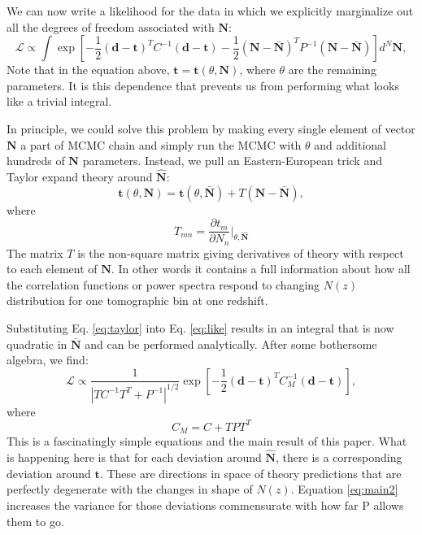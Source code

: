 \documentclass[a4paper,11pt]{article}
\newcommand{\vd}{\mathbf{d}}
\newcommand{\vt}{\mathbf{t}}
\newcommand{\vN}{\mathbf{N}}
\begin{document}
We can now write a likelihood for the data in which we explicitly marginalize out all the degrees of freedom associated with $\vN$:
\begin{equation}
\mathcal{L} \propto  \int \exp\left [-\frac{1}{2} (\vd-\vt)^T C^{-1} (\vd-\vt) -\frac{1}{2} (\vN - \bar{\vN})^T P^{-1} (\vN -\bar{\vN}) \right]  d^N\vN, \label{eq:like2}
  \end{equation}
  Note that in the equation above, $\vt=\vt(\theta,\vN)$, where $\theta$ are the remaining parameters. It is this dependence that prevents us from performing what looks like a trivial integral.

  In principle, we could solve this problem by making every single element of vector $\vN$ a part of MCMC chain and simply run the MCMC with $\theta$ and additional hundreds of $\vN$ parameters. Instead, we pull an Eastern-European trick and Taylor expand theory around $\hat{\vN}$:
  \begin{equation}
    \vt(\theta,\vN) = \vt(\theta,\bar{\vN}) + T \left(\vN - \bar{\vN} \right), \label{eq:taylor}
  \end{equation}
  where
  \begin{equation}
    T_{mn} = \frac{\partial t_m}{\partial N_n} \bigg|_{\theta,\hat{\vN}}
  \end{equation}
  The matrix $T$ is the non-square matrix giving derivatives of theory with respect to each element of $\vN$. In other words it contains a full information about how all the correlation functions or power spectra respond to changing $N(z)$ distribution for one tomographic bin at one redshift.

  Substituting Eq. \ref{eq:taylor} into Eq. \ref{eq:like} results in an integral that is now quadratic in $\bar{\vN}$ and can be performed analytically. After some bothersome algebra, we find:
  \begin{equation}
    \mathcal{L} \propto \frac{1}{|T C^{-1} T^T +P^{-1} |^{1/2}} \exp\left [-\frac{1}{2} (\vd-\vt)^T C_M^{-1} (\vd-\vt) \right], \label{eq:main1}
  \end{equation}
  where
  \begin{equation}
    C_M = C + T PT^T \label{eq:main2}
  \end{equation}
  This is a fascinatingly simple equations and the main result of this paper. What is happening here is that for each deviation around $\hat{\vN}$, there is a corresponding deviation around $\vt$. These are directions in  space of theory predictions that are perfectly degenerate with the changes in shape of $N(z)$.  Equation \ref{eq:main2}  increases the variance for those deviations commensurate with how far P allows them to go.
\end{document}
